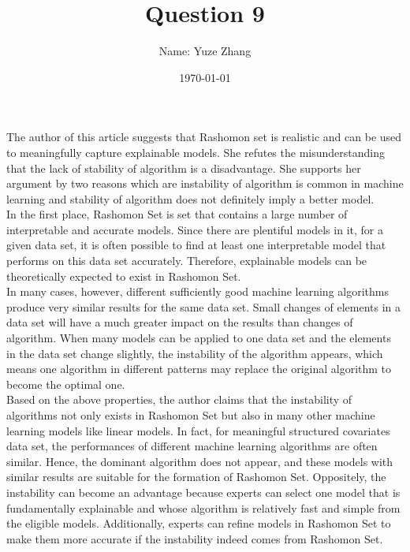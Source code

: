 \documentclass[12pt]{article}
\title{Question 9}
\author{Name: Yuze Zhang}
\date{\today}
\begin{document}
    \maketitle

    \clearpage

 \indent\indent 
 
The author of this article suggests that Rashomon set is realistic and can be used to meaningfully capture explainable models. She refutes the misunderstanding that the lack of stability of algorithm is a disadvantage. She supports her argument by two reasons which are instability of algorithm is common in machine learning and stability of algorithm does not definitely imply a better model.
~\\

In the first place, Rashomon Set is set that contains a large number of interpretable and accurate models. Since there are plentiful models in it, for a given data set, it is often possible to find at least one interpretable model that performs on this data set accurately. Therefore, explainable models can be theoretically expected to exist in Rashomon Set.
~\\

In many cases, however, different sufficiently good machine learning algorithms produce very similar results for the same data set. Small changes of elements in a data set will have a much greater impact on the results than changes of algorithm. When many models can be applied to one data set and the elements in the data set change slightly, the instability of the algorithm appears, which means one algorithm in different patterns may replace the original algorithm to become the optimal one.
~\\

Based on the above properties, the author claims that the instability of algorithms not only exists in Rashomon Set but also in many other machine learning models like linear models. In fact, for meaningful structured covariates data set, the performances of different machine learning algorithms are often similar. Hence, the dominant algorithm does not appear, and these models with similar results are suitable for the formation of Rashomon Set. Oppositely, the instability can become an advantage because experts can select one model that is fundamentally explainable and whose algorithm is relatively fast and simple from the eligible models. Additionally, experts can refine models in Rashomon Set to make them more accurate if the instability indeed comes from Rashomon Set.
~\\
\end{document}
